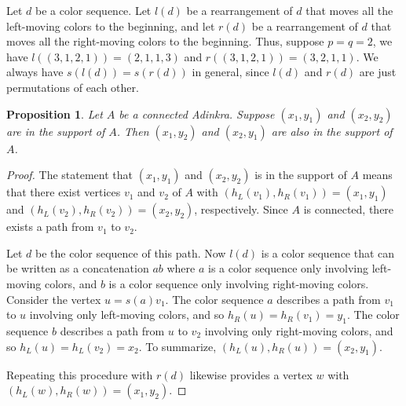 \documentclass[12pt,twoside,singlespace]{article}
\numberwithin{equation}{section}
\newtheorem{prop}[equation]{Proposition}
\theoremstyle{definition}
\begin{document}
Let $d$ be a color sequence.  Let $l(d)$ be a rearrangement of $d$ that moves all the left-moving colors to the beginning, and let $r(d)$ be a rearrangement of $d$ that moves all the right-moving colors to the beginning. Thus, suppose $p = q = 2$, we have $l((3,1,2,1)) = (2,1,1,3)$ and $r((3,1,2,1)) = (3,2,1,1)$. We always have $s(l(d)) = s(r(d))$ in general, since $l(d)$ and $r(d)$ are just permutations of each other.

\begin{prop}
\label{prop:rectangle-completion}
Let $A$ be a connected Adinkra.  Suppose $(x_1,y_1)$ and $(x_2,y_2)$ are in the support of $A$.  Then $(x_1,y_2)$ and $(x_2,y_1)$ are also in the support of $A$.
\end{prop}
\begin{proof}
The statement that $(x_1,y_1)$ and $(x_2,y_2)$ is in the support of $A$ means that there exist vertices $v_1$ and $v_2$ of $A$ with $(h_L(v_1),h_R(v_1))=(x_1,y_1)$ and $(h_L(v_2),h_R(v_2))=(x_2,y_2)$, respectively.  Since $A$ is connected, there exists a path from $v_1$ to $v_2$.

Let $d$ be the color sequence of this path.  Now $l(d)$ is a color sequence that can be written as a concatenation $ab$ where $a$ is a color sequence only involving left-moving colors, and $b$ is a color sequence only involving right-moving colors.  Consider the vertex $u=s(a)v_1$.  The color sequence $a$ describes a path from $v_1$ to $u$ involving only left-moving colors, and so $h_R(u)=h_R(v_1)=y_1$.  The color sequence $b$ describes a path from $u$ to $v_2$ involving only right-moving colors, and so $h_L(u)=h_L(v_2)=x_2$.  To summarize, $(h_L(u),h_R(u))=(x_2,y_1)$.

Repeating this procedure with $r(d)$ likewise provides a vertex $w$ with $(h_L(w),h_R(w))=(x_1,y_2)$.
\end{proof}
\end{document}
